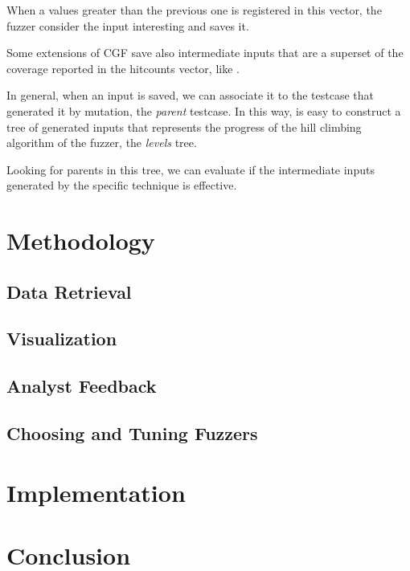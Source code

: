\documentclass[conference,compsoc]{IEEEtran}
\begin{document}
When a values greater than the previous one is registered in this vector, the fuzzer consider the input interesting and saves it.

Some extensions of CGF save also intermediate inputs that are a superset of the coverage reported in the hitcounts vector, like \cite{lafintel} \cite{ijon} \cite{besensitive}.

In general, when an input is saved, we can associate it to the testcase that generated it by mutation, the {\it parent} testcase. In this way, is easy to construct a tree of generated inputs that represents the progress of the hill climbing algorithm of the fuzzer, the {\it levels} tree.

Looking for parents in this tree, we can evaluate if the intermediate inputs generated by the specific technique is effective.

\section{Methodology}



\subsection{Data Retrieval}

\subsection{Visualization}

\subsection{Analyst Feedback}

\subsection{Choosing and Tuning Fuzzers}

\section{Implementation}


\section{Conclusion}
\end{document}
